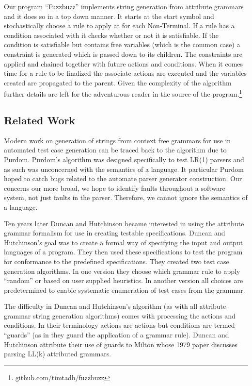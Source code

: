 Our program ``Fuzzbuzz'' implements string generation from attribute grammars
and it does so in a top down manner. It starts at the start symbol and
stochastically choose a rule to apply at for each Non-Terminal. If a rule has a
condition associated with it checks whether or not it is satisfiable. If the
condition is satisfiable but contains free variables (which is the common case)
a constraint is generated which is passed down to its children. The constraints
are applied and chained together with future actions and conditions. When it
comes time for a rule to be finalized the associate actions are executed and the
variables created are propagated to the parent. Given the complexity of the
algorithm further details are left for the adventurous reader in the source of
the program.\footnote{github.com/timtadh/fuzzbuzz}

\subsection{Related Work}

Modern work on generation of strings from context free grammars for use in
automated test case generation can be traced back to the algorithm due to
Purdom.\cite{Purdom1972} Purdom's algorithm was designed specifically to test
LR(1) parsers and as such was unconcerned with the semantics of a language. It
particular Purdom hoped to catch bugs related to the automate parser generator
construction. Our concerns our more broad, we hope to identify faults throughout
a software system, not just faults in the parser. Therefore, we cannot ignore
the semantics of a language.

Ten years later Duncan and Hutchinson became interested in using the attribute
grammar formalism for use in creating testable specifications.\cite{Duncan1981}
Duncan and Hutchinson's goal was to create a formal way of specifying the input
and output languages of a program. They then used these specifications to test
the program for conformance to the predefined specifications. They created two
test case generation algorithms. In one version they choose which grammar rule
to apply ``random'' or based on user supplied heuristics. In another version all
choices are predetermined to enable systematic enumeration of test cases from
the grammar.

The difficulty in Duncan and Hutchinson's algorithm (as with all attribute
grammar string generation algorithms) comes with processing the actions and
conditions. In their terminology actions are actions but conditions are termed
``guards'' (as in they guard the application of a grammar rule). Duncan and
Hutchinson attribute their use of guards to Milton whose 1979 paper discusses
parsing LL(k) attributed grammars.\cite{Milton1979}

